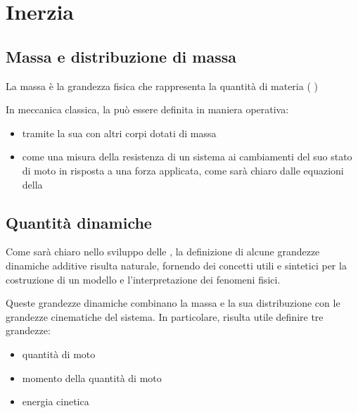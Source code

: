 \documentclass[letterpaper,10pt,italian]{jupyterBook}
\begin{document}
\chapter{Inerzia}
\label{\detokenize{ch/mechanics/inertia:inerzia}}\label{\detokenize{ch/mechanics/inertia:physics-hs-mechanics-inertia}}\label{\detokenize{ch/mechanics/inertia::doc}}

\section{Massa e distribuzione di massa}
\label{\detokenize{ch/mechanics/inertia:massa-e-distribuzione-di-massa}}
\sphinxAtStartPar
La massa è la grandezza fisica che rappresenta la quantità di materia ( )

\sphinxAtStartPar
In meccanica classica, la può essere definita in maniera operativa:
\begin{itemize}
\item {} 
\sphinxAtStartPar
tramite la sua {\hyperref[\detokenize{ch/mechanics/actions-examples:physics-hs-mechanics-actions-gravitation}]{}} con altri corpi dotati di massa

\item {} 
\sphinxAtStartPar
come una misura della resistenza di un sistema ai cambiamenti del suo stato di moto in risposta a una forza applicata, come sarà chiaro dalle equazioni della {\hyperref[\detokenize{ch/mechanics/dynamics:physics-hs-mechanics-dynamics}]{}}

\end{itemize}


\section{Quantità dinamiche}
\label{\detokenize{ch/mechanics/inertia:quantita-dinamiche}}
\sphinxAtStartPar
Come sarà chiaro nello sviluppo delle {\hyperref[\detokenize{ch/mechanics/dynamics-notes:physics-hs-mechanics-dynamics-eom-points}]{}}, la definizione di alcune grandezze dinamiche additive risulta naturale, fornendo dei concetti utili e sintetici per la costruzione di un modello e l’interpretazione dei fenomeni fisici.

\sphinxAtStartPar
Queste grandezze dinamiche combinano la massa e la sua distribuzione con le grandezze cinematiche del sistema. In particolare, risulta utile definire tre grandezze:
\begin{itemize}
\item {} 
\sphinxAtStartPar
quantità di moto

\item {} 
\sphinxAtStartPar
momento della quantità di moto

\item {} 
\sphinxAtStartPar
energia cinetica

\end{itemize}
\end{document}
